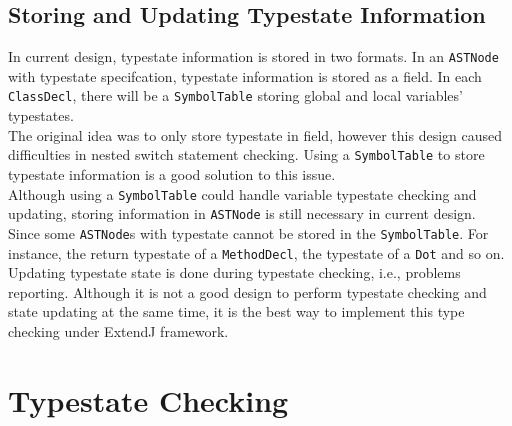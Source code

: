 \documentclass[]{article}
\begin{document}
\subsection{Storing and Updating Typestate Information}
In current design, typestate information is stored in two formats. In an \texttt{ASTNode} with typestate specifcation, typestate information is stored as a field. In each \texttt{ClassDecl}, there will be a \texttt{SymbolTable} storing global and local variables' typestates.\\[0.2cm]
The original idea was to only store typestate in field, however this design caused difficulties in nested switch statement checking. Using a \texttt{SymbolTable} to store typestate information is a good solution to this issue.\\[0.2cm]
Although using a \texttt{SymbolTable} could handle variable typestate checking and updating, storing information in \texttt{ASTNode} is still necessary in current design. Since some \texttt{ASTNode}s with typestate cannot be stored in the \texttt{SymbolTable}. For instance, the return typestate of a \texttt{MethodDecl}, the typestate of a \texttt{Dot} and so on. \\[0.2cm]
Updating typestate state is done during typestate checking, i.e., problems reporting. Although it is not a good design to perform typestate checking and state updating at the same time, it is the best way to implement this type checking under ExtendJ framework.

\section{Typestate Checking}
\end{document}
